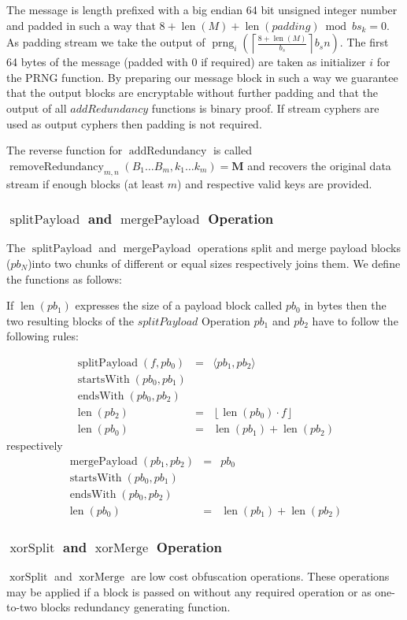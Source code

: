 \documentclass[9pt,journal,compsoc]{IEEEtran}
\DeclareMathOperator{\prng}{prng}
\DeclareMathOperator{\len}{len}
\DeclareMathOperator{\xorSplit}{xorSplit}
\DeclareMathOperator{\xorMerge}{xorMerge}
\DeclareMathOperator{\splitPayload}{splitPayload}
\DeclareMathOperator{\mergePayload}{mergePayload}
\DeclareMathOperator{\startsWith}{startsWith}
\DeclareMathOperator{\lendsWith}{endsWith}
\DeclareMathOperator{\addRedundancy}{addRedundancy}
\DeclareMathOperator{\removeRedundancy}{removeRedundancy}
\begin{document}
The message is length prefixed with a big endian 64 bit unsigned integer number and padded in such a way that $8+\len(M)+\len(padding) \bmod bs_k =0$. As padding stream we take the output of $\prng_i\left(\left\lceil\frac{8+\len(M)}{b_s}\right\rceil b_s n\right )$. The first 64 bytes of the message (padded with 0 if required) are taken as initializer $i$ for the PRNG function. By preparing our message block in such a way we guarantee that the output blocks are encryptable without further padding and that the output of all $addRedundancy$ functions is binary proof. If stream cyphers are used as output cyphers then padding is not required.

The reverse function for $\addRedundancy$ is called $\removeRedundancy_{m,n}(B_1\ldots B_{m},k_1\ldots k_{m})=\mathbf{M}$ and recovers the original data stream if enough blocks (at least $m$) and respective valid keys are provided. 

\subsubsection{$\splitPayload$ and $\mergePayload$ Operation}
The $\splitPayload$ and $\mergePayload$ operations split and merge payload blocks ($pb_N$)into two chunks of different or equal sizes respectively joins them. We define the functions as follows:

If $\len(pb_1)$ expresses the size of a payload block called $pb_0$ in bytes then the two resulting blocks of the $splitPayload$ Operation $pb_1$ and $pb_2$ have to follow the following rules:

\begin{eqnarray}
\splitPayload(f, pb_0) & = &\langle pb_1, pb_2 \rangle\\
\startsWith(pb_0, pb_1)\\
\lendsWith(pb_0, pb_2)\\
\len(pb_2) & = & \left\lfloor \len(pb_0)\cdot f\right \rfloor\\
\len(pb_0) & = & \len(pb_1) + \len(pb_2)
\end{eqnarray}
respectively
\begin{eqnarray}
\mergePayload(pb_1, pb_2) & = & pb_0 \\
\startsWith(pb_0, pb_1)\\
\lendsWith(pb_0, pb_2)\\
\len(pb_0) & = & \len(pb_1) + \len(pb_2)
\end{eqnarray}
 
\subsubsection{$\xorSplit$ and $\xorMerge$ Operation}
$\xorSplit$ and $\xorMerge$ are low cost obfuscation operations. These operations may be applied if a block is passed on without any required operation or as one-to-two blocks redundancy generating function. 
\end{document}
